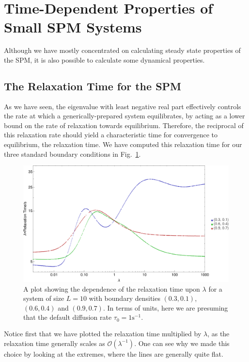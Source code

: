 \section{Time-Dependent Properties of Small SPM Systems} \label{sec:TRMTimeDep}
Although we have mostly concentrated on calculating steady state properties of the SPM, it is also possible to calculate some dynamical properties. 
\subsection{The Relaxation Time for the SPM} \label{sec:relaxTime}
As we have seen, the eigenvalue with least negative real
part effectively controls the rate at which a generically-prepared system equilibrates, by acting as a lower bound on the rate of relaxation towards equilibrium. Therefore, the reciprocal of this 
relaxation rate should yield a characteristic time for convergence to equilibrium, the relaxation
time. We have computed this relaxation time for
our three standard boundary conditions in Fig.~\ref{fig:TRMRelaxTime}.
 \begin{figure}[h!]
 \caption[The dependence of the relaxation time on $\lambda$ for three sets of boundary conditions.]{\label{fig:TRMRelaxTime} 
A plot showing the dependence of the relaxation time upon $\lambda$ for a system of size $L=10$ with
boundary densities $(0.3, 0.1)$, $(0.6, 0.4)$ and $(0.9, 0.7)$. In terms of units, here we are presuming that the default diffusion rate $\tau_0 = 1 \mathrm{s}^{-1}$.
 }
  \begin{center}
 \includegraphics[width=1.0\textwidth]{TRM/images/TRMRelaxTime}
  \end{center}
\end{figure}
Notice first that we have plotted the relaxation time multiplied by $\lambda$, as the relaxation time
generally scales as $\mathcal{O}(\lambda^{-1})$. One can see why we made this choice by looking at the
extremes, where the lines are generally quite flat.

